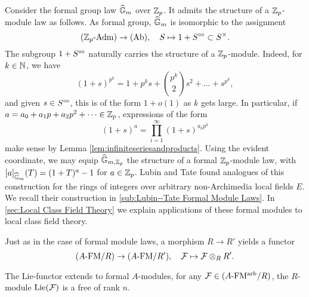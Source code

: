 \documentclass[../main.tex]{subfiles}
\begin{document}
\begin{xpl}
  Consider the formal group law $\widehat{\mathbb{G}}_m$ over $\mathbb{Z}_p$. It 
  admits the structure of a $\mathbb{Z}_p$-module law as follows. 
  As formal group, $\widehat{\mathbb{G}}_m$ is isomorphic to the assignment
  \begin{equation*}
    {({\mathbb{Z}_p}\textnormal-\allowbreak\mathrm{Adm})} \to {(\mathrm{Ab})}, \quad S \mapsto 1 + S^{\circ \hspace{-0.5pt} \circ} \subset S^\times.
  \end{equation*}
  The subgroup $1 + S^{\circ \hspace{-0.5pt} \circ}$ naturally carries the structure of a $\mathbb{Z}_p$-module.
  Indeed, for $k \in \mathbb{N}$, we have
  \begin{equation*}
    (1+s)^{p^k} = 1 + p^ks + \binom{p^k}2 s^2 + \dots + s^{p^k},
  \end{equation*}
  and given $s \in S^{\circ \hspace{-0.5pt} \circ}$, this is of the form $1+ o(1)$ as $k$ gets large. 
  In particular, if $a = a_0 + a_1 p + a_2p^2 + \dots \in \mathbb{Z}_p$, expressions of  the form
  \begin{equation*}
    (1+s)^a = \prod_{i = 1}^\infty (1+s)^{a_k p^k}
  \end{equation*}
  make sense by Lemma \ref{lem:infiniteseriesandproducts}. 
  Using the evident coordinate, we may equip
  $\widehat{\mathbb{G}}_{m,\mathbb{Z}_p}$ the structure of a formal $\mathbb{Z}_p$-module law, with
  $[a]_{\widehat{\mathbb{G}}_m}(T) = (1+T)^a -1$ for $a \in \mathbb{Z}_p$. 
  Lubin and Tate found analogues of this construction for the rings of integers 
  over arbitrary non-Archimedia local fields $E$. We recall their construction in 
  \cref{sub:Lubin--Tate Formal Module Laws}. In  \cref{sec:Local Class
  Field Theory} we explain applications of these formal modules to local class
  field theory.
\end{xpl}

Just as in the case of formal 
module laws, a morphism $R \to R'$ yields a functor 
\begin{equation*} 
  {({A}\textnormal-\allowbreak\mathrm{FM}/{R})} \to {({A}\textnormal-\allowbreak\mathrm{FM}/{R'})}, \quad \mathcal{F} \mapsto \mathcal{F} \otimes_R R'.
\end{equation*}

The Lie-functor extends to formal $A$-modules, for any $\mathcal{F} \in {({A}\textnormal-\allowbreak\mathrm{FM^{arb}}/{R})}$,
the $R$-module $\operatorname{Lie}(\mathcal{F})$ is a free of rank $n$.
\end{document}
